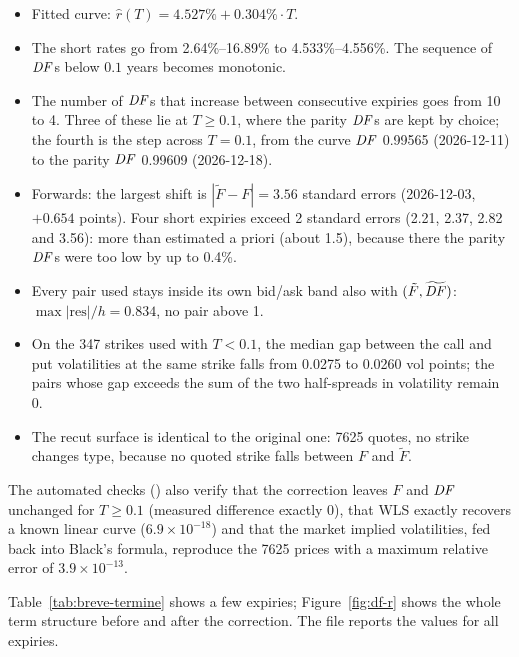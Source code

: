 \begin{progetto}[title={In the qpricer project: the short-end correction}]
\begin{itemize}
\item Fitted curve: $\hat r(T)=4.527\%+0.304\%\cdot T$.
\item The short rates go from 2.64\%--16.89\% to 4.533\%--4.556\%. The sequence of $\mathit{DF}$s below $0.1$ years becomes
monotonic.
\item The number of $\mathit{DF}$s that increase between consecutive expiries goes from 10 to 4. Three of these lie at
$T\ge0.1$, where the parity $\mathit{DF}$s are kept by choice; the fourth is the step across $T=0.1$, from the curve $\mathit{DF}$
0.99565 (\mbox{2026-12-11}) to the parity $\mathit{DF}$ 0.99609 (\mbox{2026-12-18}).
\item Forwards: the largest shift is $|\tilde F-F|=3.56$ standard errors (\mbox{2026-12-03}, $+0.654$ points). Four
short expiries exceed 2 standard errors (2.21, 2.37, 2.82 and 3.56): more than estimated a priori (about 1.5),
because there the parity $\mathit{DF}$s were too low by up to 0.4\%.
\item Every pair used stays inside its own bid/ask band also with $(\tilde F,\widetilde{\mathit{DF}})$:
$\max|\text{res}|/h=0.834$, no pair above 1.
\item On the 347 strikes used with $T<0.1$, the median gap between the call and put volatilities at the same strike
falls from 0.0275 to 0.0260 vol points; the pairs whose gap exceeds the sum of the two half-spreads in volatility
remain 0.
\item The recut surface is identical to the original one: 7625 quotes, no strike changes type, because no quoted
strike falls between $F$ and $\tilde F$.
\end{itemize}
The automated checks () also verify that the correction leaves $F$ and $\mathit{DF}$ unchanged
for $T\ge0.1$ (measured difference exactly 0), that WLS exactly recovers a known linear curve
(${6.9\times10^{-18}}$) and that the market implied volatilities, fed back into Black's formula, reproduce the 7625
prices with a maximum relative error of ${3.9\times10^{-13}}$.
\end{progetto}

Table~\ref{tab:breve-termine} shows a few expiries; Figure~\ref{fig:df-r} shows the whole term structure before and
after the correction. The file  reports the values for all expiries.


